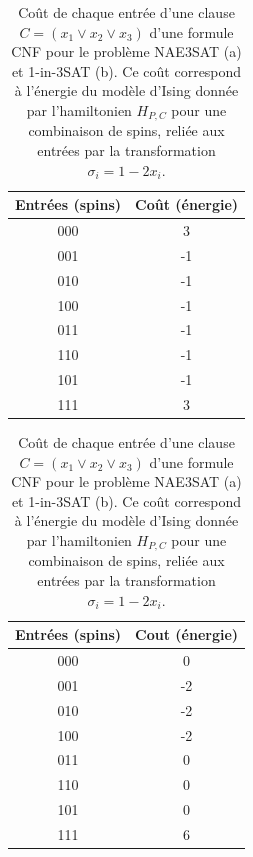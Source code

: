 \begin{table}[h]
    \centering
    \begin{subtable}{0.49\textwidth}
        \centering
        \begin{tabular}{c c}
            \hline
            Entrées (spins) & Coût (énergie) \\
            \hline
            000 & 3 \\
            001 & -1 \\
            010 & -1 \\
            100 & -1 \\
            011 & -1 \\
            110 & -1 \\
            101 & -1 \\
            111 & 3 \\
            \hline
        \end{tabular}
        \caption{}
        \label{tab:energie-nae3sat}
    \end{subtable}
    \begin{subtable}{0.49\textwidth}
        \centering
        \begin{tabular}{c c}
            \hline
            Entrées (spins) & Cout (énergie) \\
            \hline
            000 & 0 \\
            001 & -2 \\
            010 & -2 \\
            100 & -2 \\
            011 & 0 \\
            110 & 0 \\
            101 & 0 \\
            111 & 6 \\
            \hline
        \end{tabular}
        \caption{}
        \label{tab:energie-1in3sat}
    \end{subtable}
    \caption{Coût de chaque entrée d'une clause $C = (x_{1} \lor x_{2} \lor x_{3})$ d'une formule CNF pour le problème NAE3SAT (a) et 1-in-3SAT (b). Ce coût correspond à l'énergie du modèle d'Ising donnée par l'hamiltonien $H_{P,C}$ pour une combinaison de spins, reliée aux entrées par la transformation $\sigma_{i} = 1 - 2x_{i}$.}
\end{table}

